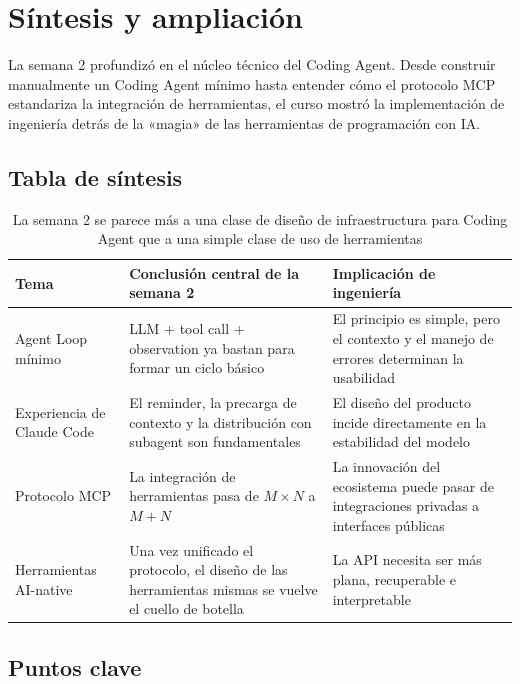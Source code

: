 \section{Síntesis y ampliación}

La semana 2 profundizó en el núcleo técnico del Coding Agent. Desde construir manualmente un Coding Agent mínimo hasta entender cómo el protocolo MCP estandariza la integración de herramientas, el curso mostró la implementación de ingeniería detrás de la «magia» de las herramientas de programación con IA.

\subsection{Tabla de síntesis}

\begin{table}[H]
\centering
\begin{tabular}{p{2.8cm}p{4.2cm}p{4.0cm}}
\toprule
\textbf{Tema} & \textbf{Conclusión central de la semana 2} & \textbf{Implicación de ingeniería} \\
\midrule
Agent Loop mínimo & LLM + tool call + observation ya bastan para formar un ciclo básico & El principio es simple, pero el contexto y el manejo de errores determinan la usabilidad \\
Experiencia de Claude Code & El reminder, la precarga de contexto y la distribución con subagent son fundamentales & El diseño del producto incide directamente en la estabilidad del modelo \\
Protocolo MCP & La integración de herramientas pasa de $M \times N$ a $M + N$ & La innovación del ecosistema puede pasar de integraciones privadas a interfaces públicas \\
Herramientas AI-native & Una vez unificado el protocolo, el diseño de las herramientas mismas se vuelve el cuello de botella & La API necesita ser más plana, recuperable e interpretable \\
\bottomrule
\end{tabular}
\caption{La semana 2 se parece más a una clase de diseño de infraestructura para Coding Agent que a una simple clase de uso de herramientas}
\end{table}

\subsection{Puntos clave}

